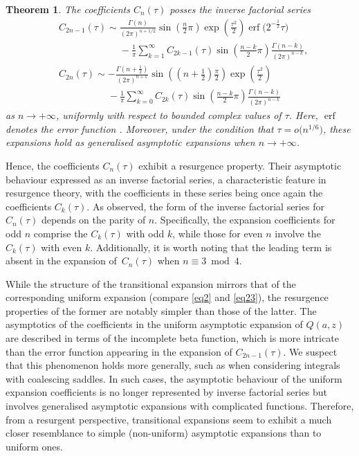 \documentclass[pdftex]{sigma}
\def\erf{\operatorname{erf}}
\numberwithin{equation}{section}
\newtheorem{Theorem}{Theorem}[section]
\begin{document}
\begin{Theorem}\label{thm1} The coefficients $C_n(\tau)$ posses the inverse factorial series
\begin{align}
& C_{2n - 1} (\tau ) \sim \frac{\Gamma (n)}{(2\pi )^{n + 1/2}}\sin \left( \frac{n }{2}\pi \right)\exp \left( \frac{\tau ^2 }{2} \right)\erf\big( 2^{ - \frac{1}{2}} \tau \big) \nonumber\\
&\phantom{C_{2n - 1} (\tau ) \sim}{}- \frac{1}{\pi }\sum_{k = 1}^\infty C_{2k - 1} (\tau )\sin \left( \frac{n - k}{2}\pi \right)\frac{\Gamma (n - k)}{(2\pi )^{n - k} } ,\label{eq14}
\\ &
C_{2n} (\tau ) \sim - \frac{\Gamma \left( n + \frac{1}{2} \right)}{(2\pi )^{n + 1} }\sin \left( \left( n + \frac{1}{2} \right)\frac{\pi }{2} \right)\exp \left( \frac{\tau ^2}{2} \right) \nonumber\\
&\phantom{C_{2n} (\tau ) \sim}{}- \frac{1}{\pi }\sum\limits_{k = 0}^\infty C_{2k} (\tau )\sin \left( \frac{n - k}{2}\pi \right)\frac{\Gamma (n - k)}{(2\pi )^{n - k} }\label{eq15}
\end{align}
as $n\to +\infty$, uniformly with respect to bounded complex values of $\tau$. Here, $\erf$ denotes the error function {\rm\cite[equation~(7.2.1)]{DLMF}}. Moreover, under the condition that $\tau = o\big(n^{1/6}\big)$, these expansions hold as generalised asymptotic expansions {\rm\cite[Section~2.1\,(v)]{DLMF}} when $n\to +\infty$.
\end{Theorem}

Hence, the coefficients $C_n(\tau)$ exhibit a resurgence property. Their asymptotic behaviour expressed as an inverse factorial series, a characteristic feature in resurgence theory, with the coefficients in these series being once again the coefficients $C_k(\tau)$. As observed, the form of the inverse factorial series for $C_n(\tau)$ depends on the parity of $n$. Specifically, the expansion coefficients for odd $n$ comprise the $C_k(\tau)$ with odd $k$, while those for even $n$ involve the $C_k(\tau)$ with even $k$. Additionally, it is worth noting that the leading term is absent in the expansion of~$C_n(\tau)$ when $n \equiv 3 \bmod{4}$.

While the structure of the transitional expansion mirrors that of the corresponding uniform expansion (compare \eqref{eq2} and \eqref{eq23}), the resurgence properties of the former are notably simpler than those of the latter. The asymptotics of the coefficients in the uniform asymptotic expansion of $Q(a,z)$ are described in terms of the incomplete beta function, which is more intricate than the error function appearing in the expansion of $C_{2n - 1}(\tau)$. We suspect that this phenomenon holds more generally, such as when considering integrals with coalescing saddles. In such cases, the asymptotic behaviour of the uniform expansion coefficients is no longer represented by inverse factorial series but involves generalised asymptotic expansions with complicated functions. Therefore, from a resurgent perspective, transitional expansions seem to exhibit a much closer resemblance to simple (non-uniform) asymptotic expansions than to uniform ones.
\end{document}
